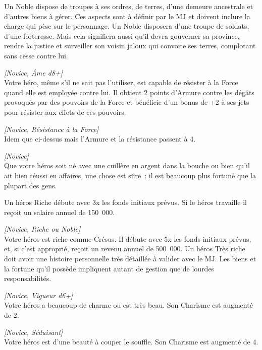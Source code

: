\begin{description}[align=left]
        Un Noble dispose de troupes à ses ordres, de terres, d’une demeure ancestrale et d’autres biens à gérer. Ces aspects sont à définir par le MJ et doivent inclure la charge qui pèse sur le personnage. Un Noble disposera d’une troupe de soldats, d’une forteresse. Mais cela signifiera aussi qu’il devra gouverner sa province, rendre la justice et surveiller son voisin jaloux qui convoite ses terres, complotant sans cesse contre lui.

    \item [Résistance à la Force]
    	\emph{[Novice, \^Ame d8+]}\\
        Votre héro, même s’il ne sait pas l’utiliser, est capable de résister à la Force quand elle est employée contre lui. Il obtient 2 points d’Armure contre les dégâts provoqués par des pouvoirs de la Force et bénéficie d’un bonus de +2 à ses jets pour résister aux effets de ces pouvoirs.

    \item [Grande résistance à la Force]
    	\emph{[Novice, Résistance à la Force]}\\
        Idem que ci-dessus mais l’Armure et la résistance passent à 4.

    \item [Riche]
    	\emph{[Novice]}\\
        Que votre héros soit né avec une cuillère en argent dans la bouche ou bien qu’il ait bien réussi en affaires, une chose est sûre~: il est beaucoup plus fortuné que la plupart des gens.

		Un héros Riche débute avec 3x les fonds initiaux prévus. Si le héros travaille il reçoit un salaire annuel de 150~000\crg.

    \item [Très riche]
    	\emph{[Novice, Riche ou Noble]}\\
        Votre héros est riche comme Crésus. Il débute avec 5x les fonds initiaux prévus, et, si c’est approprié, reçoit un revenu annuel de 500~000\crg. Un héros Très riche doit avoir une histoire personnelle très détaillée à valider avec le MJ. Les biens et la fortune qu’il possède impliquent autant de gestion que de lourdes responsabilités.

    \item [Séduisant]
    	\emph{[Novice, Vigueur d6+]}\\
        Votre héros a beaucoup de charme ou est très beau. Son Charisme est augmenté de 2.

    \item [Très séduisant]
    	\emph{[Novice, Séduisant]}\\
        Votre héros est d’une beauté à couper le souffle. Son Charisme est augmenté de 4.


\end{description}
